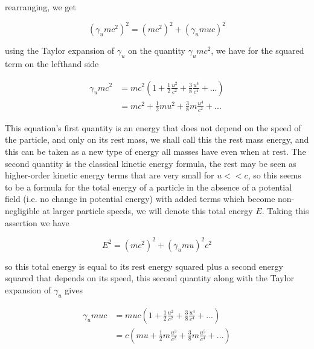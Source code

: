 rearranging, we get

\begin{equation}
	\label{eq: total relativistic energy}
	\left( \gamma_{u} m c^2 \right)^2 = (mc^2)^2 + \left( \gamma_{u} m u c \right)^2
\end{equation}

using the Taylor expansion of $\gamma_{u}$ on the quantity $\gamma_{u} mc^2$, we have for the squared term on the lefthand side

\begin{equation}
	\begin{aligned}
		\gamma_{u} mc^2 & = mc^2  \left(1 + \frac{1}{2}\frac{u^2}{c^2} + \frac{3}{8}\frac{u^4}{c^4} + ...
\right) \\
		                & = mc^2   + \frac{1}{2}mu^2 + \frac{3}{8}m\frac{u^4}{c^2} + ...
	\end{aligned}
\end{equation}

This equation's first quantity is an energy that does not depend on the speed of the particle, and only on its rest mass, we shall call this the rest mass energy, and this can be taken as a new type of energy all masses have even when at rest.
The second quantity is the classical kinetic energy formula, the rest may be seen as higher-order kinetic energy terms that are very small for $u<<c$, so this seems to be a formula for the total energy of a particle in the absence of a potential field (i.e.
no change in potential energy) with added terms which become non-negligible at larger particle speeds, we will denote this total energy $E$.
Taking this assertion we have

\begin{equation}
	E^2 = \left( mc^2 \right)^2 + (\gamma_{u}mu)^2c^2
\end{equation}

so this total energy is equal to its rest energy squared plus a second energy squared that depends on its speed, this second quantity along with the Taylor expansion of $\gamma_{u}$ gives

\begin{equation}
	\begin{aligned}
		\gamma_{u} muc & = muc  \left(1 + \frac{1}{2}\frac{u^2}{c^2} + \frac{3}{8}\frac{u^4}{c^4} + ...
\right)     \\
		               & = c \left( mu   + \frac{1}{2}m \frac{u^3}{c^2} + \frac{3}{8}m\frac{u^5}{c^4} + ...
\right)
	\end{aligned}
\end{equation}

